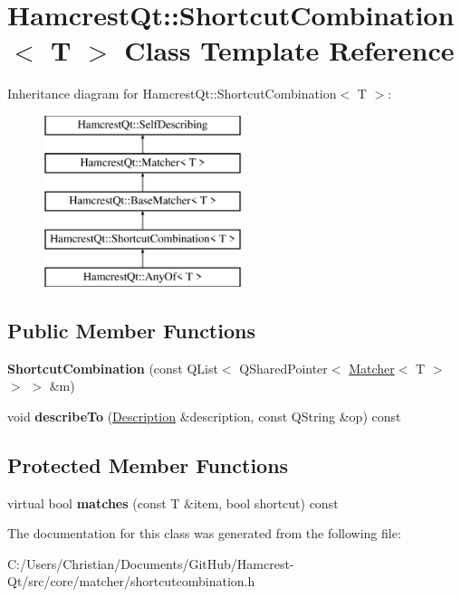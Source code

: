 \hypertarget{class_hamcrest_qt_1_1_shortcut_combination}{\section{Hamcrest\-Qt\-:\-:Shortcut\-Combination$<$ T $>$ Class Template Reference}
\label{class_hamcrest_qt_1_1_shortcut_combination}
}
Inheritance diagram for Hamcrest\-Qt\-:\-:Shortcut\-Combination$<$ T $>$\-:\begin{figure}[H]
\begin{center}
\leavevmode
\includegraphics[height=5.000000cm]{class_hamcrest_qt_1_1_shortcut_combination}
\end{center}
\end{figure}
\subsection*{Public Member Functions}
\begin{DoxyCompactItemize}
\item 
\hypertarget{class_hamcrest_qt_1_1_shortcut_combination_a5a9786df3928fbfb67c5f49c8fc3f520}{{\bfseries Shortcut\-Combination} (const Q\-List$<$ Q\-Shared\-Pointer$<$ \hyperlink{class_hamcrest_qt_1_1_matcher}{Matcher}$<$ T $>$ $>$ $>$ \&m)}\label{class_hamcrest_qt_1_1_shortcut_combination_a5a9786df3928fbfb67c5f49c8fc3f520}

\item 
\hypertarget{class_hamcrest_qt_1_1_shortcut_combination_ad00ac5caacd1944e0e9e8bf6e38aa8cf}{void {\bfseries describe\-To} (\hyperlink{class_hamcrest_qt_1_1_description}{Description} \&description, const Q\-String \&op) const }\label{class_hamcrest_qt_1_1_shortcut_combination_ad00ac5caacd1944e0e9e8bf6e38aa8cf}

\end{DoxyCompactItemize}
\subsection*{Protected Member Functions}
\begin{DoxyCompactItemize}
\item 
\hypertarget{class_hamcrest_qt_1_1_shortcut_combination_a74bee98c726131fcb588633d54581a9e}{virtual bool {\bfseries matches} (const T \&item, bool shortcut) const }\label{class_hamcrest_qt_1_1_shortcut_combination_a74bee98c726131fcb588633d54581a9e}

\end{DoxyCompactItemize}


The documentation for this class was generated from the following file\-:\begin{DoxyCompactItemize}
\item 
C\-:/\-Users/\-Christian/\-Documents/\-Git\-Hub/\-Hamcrest-\/\-Qt/src/core/matcher/shortcutcombination.\-h\end{DoxyCompactItemize}
